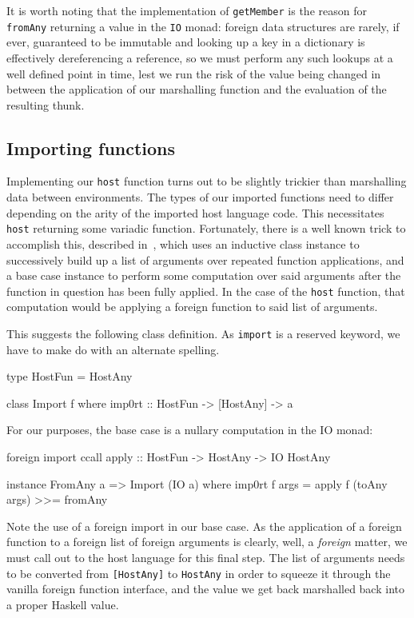 \documentclass{sigplanconf}
\begin{document}
It is worth noting that the implementation of \lstinline!getMember! is
the reason for \lstinline!fromAny! returning a value in the \lstinline!IO!
monad: foreign data structures are rarely, if ever, guaranteed to be immutable
and looking up a key in a dictionary is effectively dereferencing a reference,
so we must perform any such lookups at a well defined point in time,
lest we run the risk of the value being changed in between the application
of our marshalling function and the evaluation of the resulting thunk.

\subsection{Importing functions}\label{sec:import}
Implementing our \lstinline!host! function turns out to be slightly trickier
than marshalling data between environments.
The types of our imported functions need to differ depending on the arity of
the imported host language code. This necessitates \lstinline!host! returning
some variadic function. Fortunately, there is a well known trick to accomplish
this, described in\ \cite{printf}, which uses an inductive class instance to
successively build up a list of arguments over repeated function applications,
and a base case instance to perform some computation over said arguments after
the function in question has been fully applied.
In the case of the \lstinline!host! function, that computation would be
applying a foreign function to said list of arguments.

This suggests the following class definition. As \lstinline!import! is a
reserved keyword, we have to make do with an alternate spelling.

\begin{code}
  type HostFun = HostAny

  class Import f where
    imp0rt :: HostFun -> [HostAny] -> a
\end{code}

For our purposes, the base case is a nullary computation in the IO monad:

\begin{code}
  foreign import ccall
    apply :: HostFun -> HostAny -> IO HostAny

  instance FromAny a => Import (IO a) where
    imp0rt f args =
      apply f (toAny args) >>= fromAny
\end{code}

Note the use of a foreign import in our base case. As the application of a
foreign function to a foreign list of foreign arguments is clearly, well, a
\emph{foreign} matter, we must call out to the host language for this final
step.
The list of arguments needs to be converted from \lstinline![HostAny]! to
\lstinline!HostAny! in order to squeeze it through the vanilla foreign
function interface, and the value we get back marshalled back into a proper
Haskell value.
\end{document}
